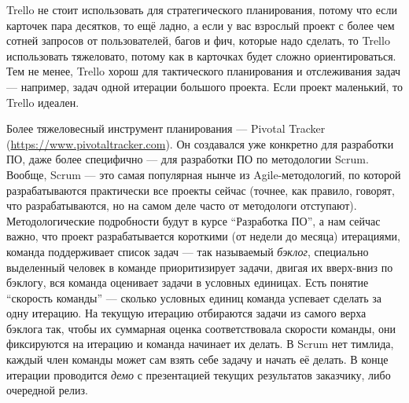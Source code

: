 \documentclass[a5paper]{article}
\begin{document}
Trello не стоит использовать для стратегического планирования, потому что если карточек пара десятков, то ещё ладно, а если у вас взрослый проект с более чем сотней запросов от пользователей, багов и фич, которые надо сделать, то Trello использовать тяжеловато, потому как в карточках будет сложно ориентироваться. Тем не менее, Trello хорош для тактического планирования и отслеживания задач --- например, задач одной итерации большого проекта. Если проект маленький, то Trello идеален.

Более тяжеловесный инструмент планирования --- Pivotal Tracker (\url{https://www.pivotaltracker.com}). Он создавался уже конкретно для разработки ПО, даже более специфично --- для разработки ПО по методологии Scrum. Вообще, Scrum --- это самая популярная нынче из Agile-методологий, по которой разрабатываются практически все проекты сейчас (точнее, как правило, говорят, что разрабатываются, но на самом деле часто от методологи отступают). Методологические подробности будут в курсе ``Разработка ПО'', а нам сейчас важно, что проект разрабатывается короткими (от недели до месяца) итерациями, команда поддерживает список задач --- так называемый \textit{бэклог}, специально выделенный человек в команде приоритизирует задачи, двигая их вверх-вниз по бэклогу, вся команда оценивает задачи в условных единицах. Есть понятие ``скорость команды'' --- сколько условных единиц команда успевает сделать за одну итерацию. На текущую итерацию отбираются задачи из самого верха бэклога так, чтобы их суммарная оценка соответствовала скорости команды, они фиксируются на итерацию и команда начинает их делать. В Scrum нет тимлида, каждый член команды может сам взять себе задачу и начать её делать. В конце итерации проводится \textit{демо} с презентацией текущих результатов заказчику, либо очередной релиз.
\end{document}
